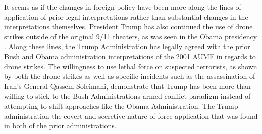 \documentclass[12pt]{article}
\begin{document}
It seems as if the changes in foreign policy have been more along the lines of application of prior legal interpretations rather than substantial changes in the interpretations themselves.
President Trump has also continued the use of drone strikes outside of the original 9/11 theaters, as was seen in the Obama presidency \autocite[35]{sterio2018}.
Along these lines, the Trump Administration has legally agreed with the prior Bush and Obama administration interpretations of the 2001 AUMF in regards to drone strikes.
The willingness to use lethal force on suspected terrorists, as shown by both the drone strikes as well as specific incidents such as the assassination of Iran's General Qassem Soleimani, demonstrate that Trump has been more than willing to stick to the Bush Administrations armed conflict paradigm instead of attempting to shift approaches like the Obama Administration.
The Trump administration the covert and secretive nature of force application that was found in both of the prior administrations.

\newpage
{}
\printbibliography[heading=none]{}
\end{document}
